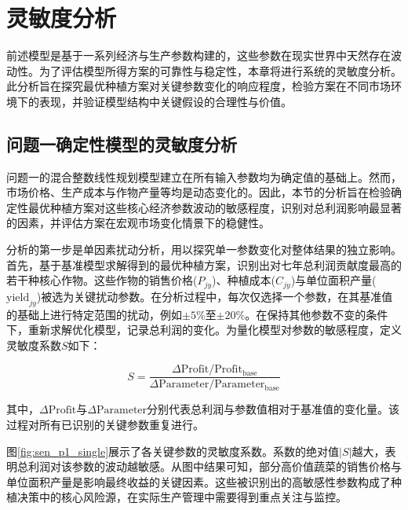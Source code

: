 \section{灵敏度分析}

前述模型是基于一系列经济与生产参数构建的，这些参数在现实世界中天然存在波动性。为了评估模型所得方案的可靠性与稳定性，本章将进行系统的灵敏度分析。此分析旨在探究最优种植方案对关键参数变化的响应程度，检验方案在不同市场环境下的表现，并验证模型结构中关键假设的合理性与价值。

\subsection{问题一确定性模型的灵敏度分析}

问题一的混合整数线性规划模型建立在所有输入参数均为确定值的基础上。然而，市场价格、生产成本与作物产量等均是动态变化的。因此，本节的分析旨在检验确定性最优种植方案对这些核心经济参数波动的敏感程度，识别对总利润影响最显著的因素，并评估方案在宏观市场变化情景下的稳健性。

分析的第一步是单因素扰动分析，用以探究单一参数变化对整体结果的独立影响。首先，基于基准模型求解得到的最优种植方案，识别出对七年总利润贡献度最高的若干种核心作物。这些作物的销售价格($P_{jy}$)、种植成本($C_{jy}$)与单位面积产量($\text{yield}_{jy}$)被选为关键扰动参数。在分析过程中，每次仅选择一个参数，在其基准值的基础上进行特定范围的扰动，例如$\pm 5\%$至$\pm 20\%$。在保持其他参数不变的条件下，重新求解优化模型，记录总利润的变化。为量化模型对参数的敏感程度，定义灵敏度系数$S$如下：

\begin{equation}
    S = \frac{\Delta \text{Profit} / \text{Profit}_{\text{base}}}{\Delta \text{Parameter} / \text{Parameter}_{\text{base}}}
\end{equation}

其中，$\Delta \text{Profit}$与$\Delta \text{Parameter}$分别代表总利润与参数值相对于基准值的变化量。该过程对所有已识别的关键参数重复进行。


图\ref{fig:sen_p1_single}展示了各关键参数的灵敏度系数。系数的绝对值$|S|$越大，表明总利润对该参数的波动越敏感。从图中结果可知，部分高价值蔬菜的销售价格与单位面积产量是影响最终收益的关键因素。这些被识别出的高敏感性参数构成了种植决策中的核心风险源，在实际生产管理中需要得到重点关注与监控。

